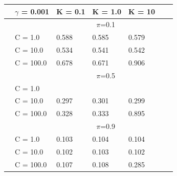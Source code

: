 \documentclass[english]{report}
\begin{document}
\begin{table}[H]
    \centering
    \begin{tabular}{ll|lllll}
        \hline
                                & \textbf{$\gamma$ = 0.001} &         K = 0.1 & K = 1.0 & K = 10 \\ \hline
                                & & \multicolumn{3}{c}{$\pi$=0.1} \\ \hline
                                & C = 1.0    & 0.588 & 0.585 & 0.579    \\
                                & C = 10.0   & 0.534 & 0.541 & 0.542  \\
                                & C = 100.0   & 0.678 & 0.671 & 0.906  \\ \hline

                                & & \multicolumn{3}{c}{$\pi$=0.5} \\ \hline
                                & C = 1.0    & \color{red}{0.295} & \color{red}{0.294} & \color{red}{0.298}    \\
                                & C = 10.0   & 0.297 & 0.301 & 0.299  \\
                                & C = 100.0   & 0.328 & 0.333 & 0.895  \\ \hline

                                & & \multicolumn{3}{c}{$\pi$=0.9} \\ \hline
                                & C = 1.0    & 0.103 & 0.104 & 0.104    \\
                                & C = 10.0   & 0.102 & 0.103 & 0.102  \\
                                & C = 100.0   & 0.107 & 0.108 & 0.285  \\ 
    \hline
    \end{tabular}
    \label{tab:RBF1_PCA9_valid}
\end{table}
\end{document}
